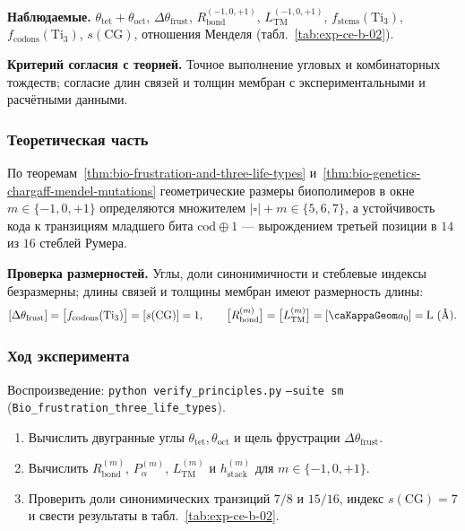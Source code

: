 \textbf{Наблюдаемые.}
$\theta_{\mathrm{tet}} + \theta_{\mathrm{oct}}$, $\Delta\theta_{\mathrm{frust}}$, $R_{\mathrm{bond}}^{(-1,0,+1)}$, $L_{\mathrm{TM}}^{(-1,0,+1)}$, $f_{\mathrm{stems}}(\mathrm{Ti}_3)$, $f_{\mathrm{codons}}(\mathrm{Ti}_3)$, $s(\text{CG})$, отношения Менделя (табл.~\ref{tab:exp-ce-b-02}).

\textbf{Критерий согласия с теорией.}
Точное выполнение угловых и комбинаторных тождеств; согласие длин связей и толщин мембран с экспериментальными и расчётными данными.

\subsubsection*{Теоретическая часть}
По теоремам~\ref{thm:bio-frustration-and-three-life-types} и~\ref{thm:bio-genetics-chargaff-mendel-mutations} геометрические размеры биополимеров в окне $m\in\{-1,0,+1\}$ определяются множителем $|\square|+m \in \{5,6,7\}$, а устойчивость кода к транзициям младшего бита $\mathrm{cod}\oplus 1$ — вырождением третьей позиции в $14$ из $16$ стеблей Румера.

\textbf{Проверка размерностей.}
Углы, доли синонимичности и стеблевые индексы безразмерны; длины связей и толщины мембран имеют размерность длины:
\[
  [\Delta\theta_{\mathrm{frust}}] = \bigl[f_{\mathrm{codons}}(\mathrm{Ti}_3)\bigr] = [s(\text{CG})] = 1,\qquad
  \bigl[R_{\mathrm{bond}}^{(m)}\bigr] = \bigl[L_{\mathrm{TM}}^{(m)}\bigr] = [\caKappaGeom a_0] = \mathrm{L}\ (\text{\normalfont\AA}).
\]

\subsubsection*{Ход эксперимента}
{\sloppy Воспроизведение: \texttt{python verify\_principles.py} \texttt{--suite sm} (\texttt{Bio\_frustration\_three\_life\_types}).\par}

\begin{enumerate}[label=\textbf{Шаг \arabic*:},leftmargin=*,itemsep=0.35em]
\item Вычислить двугранные углы $\theta_{\mathrm{tet}}, \theta_{\mathrm{oct}}$ и щель фрустрации $\Delta\theta_{\mathrm{frust}}$.
\item Вычислить $R_{\mathrm{bond}}^{(m)}$, $P_\alpha^{(m)}$, $L_{\mathrm{TM}}^{(m)}$ и $h_{\mathrm{stack}}^{(m)}$ для $m \in \{-1,0,+1\}$.
\item Проверить доли синонимических транзиций $7/8$ и $15/16$, индекс $s(\text{CG})=7$ и свести результаты в табл.~\ref{tab:exp-ce-b-02}.
\end{enumerate}

